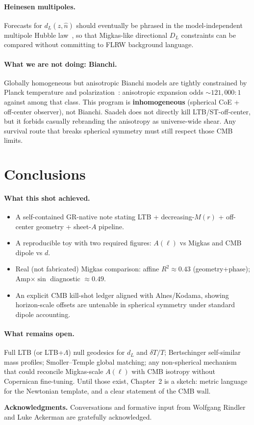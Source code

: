 \documentclass[11pt,a4paper]{article}
\begin{document}
\paragraph{Heinesen multipoles.}
Forecasts for $d_L(z,\hat n)$ should eventually be phrased in the
model-independent multipole Hubble law~\citep{Heinesen2020}, so that Migkas-like
directional $D_L$ constraints can be compared without committing to FLRW
background language.

\paragraph{What we are not doing: Bianchi.}
Globally homogeneous but anisotropic Bianchi models are tightly constrained by
Planck temperature and polarization~\citep{Saadeh2016}: anisotropic expansion
odds $\sim121{,}000:1$ against among that class. This program is
\textbf{inhomogeneous} (spherical CoE + off-center observer), not Bianchi.
Saadeh does not directly kill LTB/ST-off-center, but it forbids casually
rebranding the anisotropy as universe-wide shear. Any survival route that
breaks spherical symmetry must still respect those CMB limits.

\section{Conclusions}
\label{sec:concl}

\paragraph{What this shot achieved.}
\begin{itemize}[leftmargin=*,itemsep=2pt]
\item A self-contained GR-native note stating LTB + decreasing-$M(r)$ +
  off-center geometry + sheet-$A$ pipeline.
\item A reproducible toy with two required figures: $A(\ell)$ vs Migkas and
  CMB dipole vs $d$.
\item Real (not fabricated) Migkas comparison: affine $R^2\approx0.43$
  (geometry+phase); Amp$\times\sin$ diagnostic $\approx0.49$.
\item An explicit CMB kill-shot ledger aligned with Alnes/Kodama, showing
  horizon-scale offsets are untenable in spherical symmetry under standard
  dipole accounting.
\end{itemize}

\paragraph{What remains open.}
Full LTB (or LTB+$\Lambda$) null geodesics for $d_L$ and $\delta T/T$;
Bertschinger self-similar mass profiles; Smoller--Temple global matching;
any non-spherical mechanism that could reconcile Migkas-scale $A(\ell)$ with
CMB isotropy without Copernican fine-tuning. Until those exist, Chapter~2 is a
sketch: metric language for the Newtonian template, and a clear statement of
the CMB wall.

\bigskip
\noindent\textbf{Acknowledgments.}
Conversations and formative input from Wolfgang Rindler and Luke Ackerman are
gratefully acknowledged.



\end{document}
